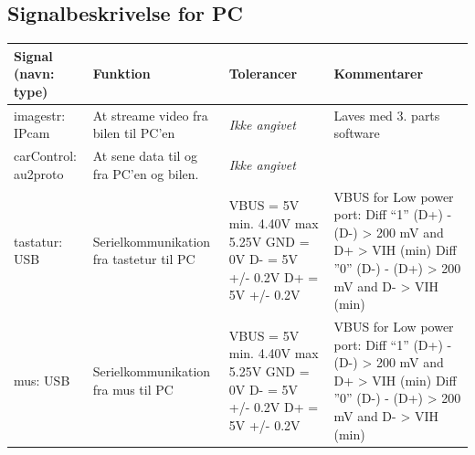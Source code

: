 \subsection{Signalbeskrivelse for PC}

\begin{table}[h]
	\centering
	\begin{tabularx}{\textwidth}{|l|X|X|X|} \hline
	\textbf{Signal (navn: type)} & \textbf{Funktion} & \textbf{Tolerancer} & \textbf{Kommentarer} \\ \hline
imagestr: IPcam
	& At streame video fra bilen til PC'en 
	& \textit{Ikke angivet} 
 	& Laves med 3. parts software
	\\ \hline
	
carControl: au2proto
	& At sene data til og fra PC'en og bilen.
	& \textit{Ikke angivet} 
	& 
	\\ \hline
	
tastatur: USB
	& Serielkommunikation fra tastetur til PC 
	& VBUS = 5V min. 4.40V max 5.25V \newline
		GND = 0V \newline
		D- = 5V +/- 0.2V \newline
		D+ = 5V +/- 0.2V
	
	& VBUS for Low power port: \newline
		Diff  “1” \newline
		(D+) - (D-) > 200 mV \newline
		and D+ > VIH (min) \newline
		Diff ”0” \newline
		(D-) - (D+) > 200 mV \newline
		and D- > VIH (min)
	\\ \hline	
	
mus: USB
	& Serielkommunikation fra mus til PC 
	& VBUS = 5V min. 4.40V max 5.25V \newline
		GND = 0V \newline
		D- = 5V +/- 0.2V \newline
		D+ = 5V +/- 0.2V

	& VBUS for Low power port: \newline
		Diff  “1” \newline
		(D+) - (D-) > 200 mV \newline
		and D+ > VIH (min) \newline
		Diff ”0” \newline
		(D-) - (D+) > 200 mV \newline
		and D- > VIH (min)
\\ \hline
	

\end{tabularx}
\end{table}
